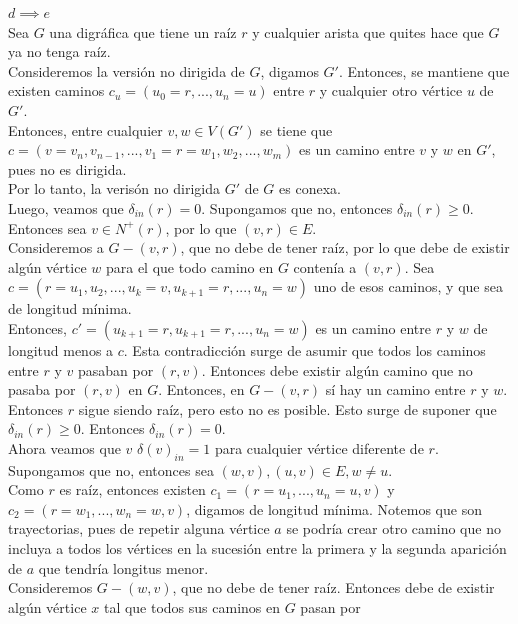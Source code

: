 \documentclass[12pt,a4paper]{report}
\begin{document}
\begin{enumerate}
{			$d \implies e$\\
			Sea $G$ una digráfica que tiene un raíz $r$ y cualquier arista que quites
			hace que $G$ ya no tenga raíz.\\
			Consideremos la versión no dirigida de $G$, digamos $G'$. Entonces, se
			mantiene que existen caminos $c_u = (u_0 = r, ..., u_n = u)$
			entre $r$ y cualquier otro vértice $u$ de $G'$.\\
			Entonces, entre cualquier $v, w \in V(G')$ se tiene que
			$c = (v = v_n, v_{n-1}, ..., v_1=r=w_1, w_2, ..., w_m)$ es un camino entre
			$v$ y $w$ en $G'$, pues no es dirigida.\\
			Por lo tanto, la verisón no dirigida $G'$ de $G$ es conexa.\\
			Luego, veamos que $\delta_{in}(r) = 0$.
			Supongamos que no, entonces $\delta_{in}(r) \geq 0$. Entonces sea
			$v \in N^+(r)$, por lo que $(v, r)\in E$.\\
			Consideremos a $G - {(v, r)}$, que no debe de tener raíz, por lo que debe
			de existir algún vértice $w$ para el que todo camino en $G$ contenía a $(v, r)$.
			Sea $c = (r = u_1, u_2, ..., u_k = v, u_{k+1} = r, ..., u_n = w)$ uno de
			esos caminos, y que sea de longitud mínima.\\
			Entonces, $c' = (u_{k+1} = r, u_{k+1} = r, ..., u_n = w)$ es un camino entre
			$r$ y $w$ de longitud menos a $c$. Esta contradicción surge de asumir que
			todos los caminos entre $r$ y $v$ pasaban por $(r, v)$. Entonces debe existir
			algún camino que no pasaba por $(r, v)$ en $G$. Entonces, en $G - {(v, r)}$
			sí hay un camino entre $r$ y $w$. Entonces $r$ sigue siendo raíz, pero esto
			no es posible. Esto surge de suponer que $\delta_{in}(r) \geq 0$.
			Entonces $\delta_{in}(r) = 0$.\\
			Ahora veamos que $v$ $\delta(v)_{in} = 1$ para cualquier vértice diferente
			de $r$.\\
			Supongamos que no, entonces sea $(w, v), (u, v) \in E, w \neq u$.\\
			Como $r$ es raíz, entonces existen $c_1 = (r = u_1, ..., u_n = u, v)$ y
			$c_2 = (r = w_1, ..., w_n=w, v)$, digamos de longitud mínima. Notemos que
			son trayectorias, pues de repetir alguna vértice $a$ se podría
			crear otro camino que no incluya a todos los vértices en la sucesión entre
			la primera y la segunda aparición de $a$ que tendría longitus menor.\\
			Consideremos $G - {(w, v)}$, que no debe de tener raíz. Entonces debe de
			existir algún vértice $x$ tal que todos sus caminos en $G$ pasan por
}
\end{enumerate}
\end{document}
